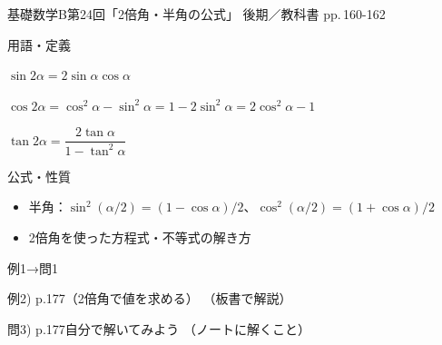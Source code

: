 \documentclass[aspectratio=43,professionalfonts,handout]{beamer}
\newcommand{\LectureNum}{24}
\newcommand{\LectureTitle}{2倍角・半角の公式}
\newcommand{\TextPages}{pp.\,160-162}
\newcommand{\CourseName}{基礎数学B}
\renewcommand{\TermName}{後期}
\begin{document}
\begin{frame}{\CourseName\quad 第\LectureNum 回「\LectureTitle 」}
  {\small \TermName\quad \TeacherName\quad ／\quad 教科書 \TextPages}

  \begin{block}{用語・定義}
  \begin{description}[labelwidth=5.5em]
    \item[\kw{$\sin 2\alpha = 2\sin\alpha\cos\alpha$}] $\sin 2\alpha = 2\sin\alpha\cos\alpha$
    \item[\kw{$\cos 2\alpha = \cos^2\alpha - \sin^2\alpha = 1 - 2\sin^2\alpha = 2\cos^2\alpha - 1$}]
      $\cos 2\alpha = \cos^2\alpha - \sin^2\alpha = 1 - 2\sin^2\alpha = 2\cos^2\alpha - 1$
    \item[\kw{$\tan 2\alpha = 2\tan\alpha/(1 - \tan^2\alpha)$}] $\tan 2\alpha = \dfrac{2\tan\alpha}{1-\tan^2\alpha}$
  \end{description}
  \end{block}
\end{frame}

\begin{frame}{公式・性質}
  \begin{block}{}
  \begin{itemize}
    \item 半角：$\sin^2(\alpha/2) = (1 - \cos\alpha)/2$、$\cos^2(\alpha/2) = (1 + \cos\alpha)/2$
    \item 2倍角を使った方程式・不等式の解き方
  \end{itemize}
  \end{block}
\end{frame}

\begin{frame}{例1→問1}
  \begin{exampleblock}{例2) p.177（2倍角で値を求める）}
    （板書で解説）
  \end{exampleblock}

  \vfill

  \begin{block}{問3) p.177\quad 自分で解いてみよう}
    （ノートに解くこと）
  \end{block}
\end{frame}
\end{document}
